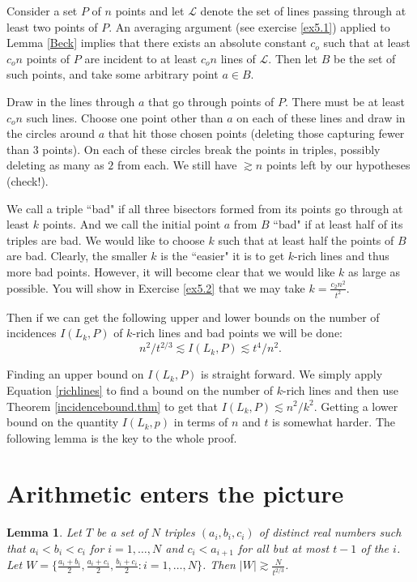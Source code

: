 \documentclass[]{stml-l}
\numberwithin{equation}{chapter}
\theoremstyle{plain}
\newtheorem{lemma}[equation]{Lemma}
\theoremstyle{definition}
\theoremstyle{remark}
\begin{document}
Consider a set $P$ of $n$ points and let  $\mathcal{L}$ denote the
set of lines passing through at least two points of $P$.  An
averaging argument (see exercise \ref{ex5.1}) applied to Lemma
\ref{Beck} implies that there exists an absolute constant $c_o$
such that at least $c_on$ points of $P$ are incident to at least
$c_on$ lines of $\mathcal{L}$.  Then let $B$ be the set of such
points, and take some arbitrary point $a \in B$.

Draw in the lines through $a$ that go through points of $P$. There
must be at least $c_on$ such lines.  Choose one point other than
$a$ on each of these lines and draw in the circles around $a$ that
hit those chosen points (deleting those capturing fewer than $3$
points).  On each of these circles break the points in triples,
possibly deleting as many as $2$ from each.  We still have
$\gtrsim n$ points left by our hypotheses (check!).

We call a triple ``bad" if all three bisectors formed from its
points go through at least $k$ points.  And we call the initial
point $a$ from $B$ ``bad" if at least half of its triples are bad.
We would like to choose $k$ such that at least half the points of
$B$ are bad.  Clearly, the smaller $k$ is the ``easier" it is to
get $k$-rich lines and thus more bad points.  However, it will
become clear that we would like $k$ as large as possible.  You
will show in Exercise \ref{ex5.2} that we may take $k=
\frac{c_2n^2}{t^2}$.

Then if we can get the following upper and lower bounds on the number of
incidences $I(L_k, P)$ of $k$-rich lines and bad points we will be done:
\begin{equation}
n^2/t^{2/3} \lesssim I(L_k, P) \lesssim t^4/n^2.
\end{equation}

Finding an upper bound on $I(L_k, P)$ is straight forward.  We
simply apply Equation \ref{richlines} to find a bound on the
number of $k$-rich lines and then use Theorem
\ref{incidencebound.thm} to get that $I(L_k, P) \lesssim n^2/k^2$.
Getting a lower bound on the quantity $I(L_k, p)$ in terms of $n$
and $t$ is somewhat harder.  The following lemma is the key to the
whole proof.

\section{Arithmetic enters the picture} 

\begin{lemma} \label{lin.lem}
Let $T$ be a set of $N$ triples $(a_i,b_i,c_i)$ of distinct real
numbers such that $a_i<b_i<c_i$ for $i=1, \ldots, N$ and
$c_i<a_{i+1}$ for all but at most $t-1$ of the $i$.  Let $W= \{
\frac{a_i+b_i}{2}, \frac{a_i+c_i}{2},\frac{b_i+c_i}{2}: i=1,
\ldots, N \}$.  Then $|W| \gtrsim \frac{N}{t^{2/3}}$.
\end{lemma}
\end{document}
